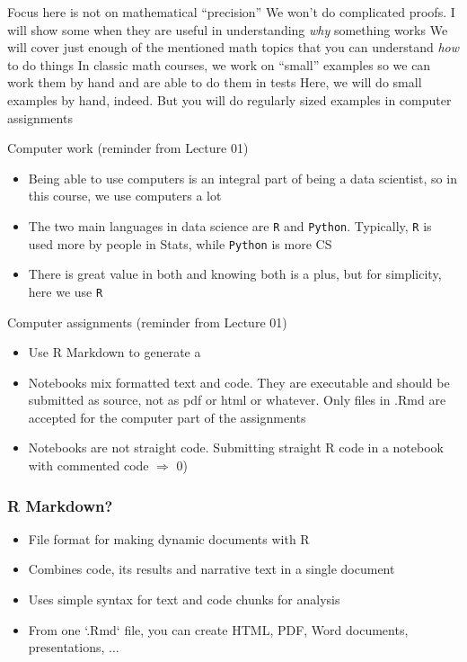 \documentclass[aspectratio=169]{beamer}\usepackage[]{graphicx}\usepackage[]{xcolor}
\begin{document}
\begin{frame}{Focus here is not on mathematical ``precision''}
\bbullet We won't do complicated proofs. I will show some when they are useful in understanding \textit{why} something works
\vfill
\bbullet We will cover just enough of the mentioned math topics that you can understand \textit{how} to do things
\vfill
\bbullet In classic math courses, we work on ``small'' examples so we can work them by hand and are able to do them in tests
\vfill
Here, we will do small examples by hand, indeed. But you will do regularly sized examples in computer assignments
\end{frame}




\begin{frame}{Computer work (reminder from Lecture 01)}
\begin{itemize}
\item Being able to use computers is an integral part of being a data scientist, so in this course, we use computers a lot
\vfill
\item The two main languages in data science are \texttt{R} and \texttt{Python}. Typically, \texttt{R} is used more by people in Stats, while \texttt{Python} is more CS
\vfill
\item There is great value in both and knowing both is a plus, but for simplicity, here we use \texttt{R}
\end{itemize}
\end{frame}

\begin{frame}{Computer assignments (reminder from Lecture 01)}
\begin{itemize}
\item Use R Markdown to generate a 
\vfill
\item Notebooks mix formatted text and code. They are executable and should be submitted as source, not as pdf or html or whatever. Only files in .Rmd are accepted for the computer part of the assignments
\vfill
\item Notebooks are not straight code. Submitting straight R code in a notebook with commented code $\Rightarrow$ 0)
\end{itemize}
\end{frame}


\begin{frame}
  \frametitle{R Markdown?}
  \begin{itemize}
    \item File format for making dynamic documents with R
    \vfill
    \item Combines code, its results and narrative text in a single document
    \vfill
    \item Uses simple  syntax for text and  code chunks for analysis
    \vfill
    \item From one `.Rmd` file, you can create HTML, PDF, Word documents, presentations, ...
  \end{itemize}
\end{frame}
\end{document}
